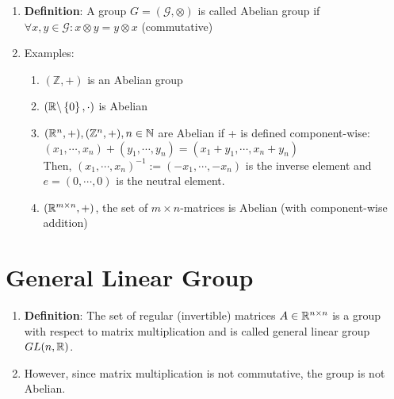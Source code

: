 \begin{enumerate}
    \item \textbf{Definition}: A group $G = (\mathcal{G}, \otimes)$ is called Abelian group if $\forall x, y \in \mathcal{G} : x \otimes y = y \otimes x$ (commutative)
    \hfill \cite{mfml/book/mml/Deisenroth-Faisal-Ong}

    \item Examples:
    \begin{enumerate}
        \item $(\mathbb{Z}, +)$ is an Abelian group
        \hfill \cite{mfml/book/mml/Deisenroth-Faisal-Ong}

        \item $( \mathbb{R} \backslash \left\{0\right\}, \cdot)$ is Abelian
        \hfill \cite{mfml/book/mml/Deisenroth-Faisal-Ong}

        \item $(\mathbb{R}^n, +),(\mathbb{Z}^n, +), n \in \mathbb{N}$ are Abelian if + is defined component-wise:
        \\
        $
            (x_1, \cdots , x_n) + (y_1, \cdots , y_n) = (x_1 + y_1, \cdots , x_n + y_n)
        $
        \\
        Then, $(x_1, \cdots , x_n)^{-1} := (-x_1, \cdots , -x_n)$ is the inverse element and $e = (0, \cdots , 0)$ is the neutral element.

        \item $(\mathbb{R}^{m\times n} , +)$, the set of $m \times n$-matrices is Abelian  (with component-wise addition)

        
    \end{enumerate}
\end{enumerate}





\section{General Linear Group}

\begin{enumerate}
    \item \textbf{Definition}: The set of regular (invertible) matrices $A \in \mathbb{R}^{n\times n}$ is a group with respect to matrix multiplication and is called general linear group $GL(n, \mathbb{R})$. 
    
    \item However, since matrix multiplication is not commutative, the group is not Abelian.

    
\end{enumerate}

